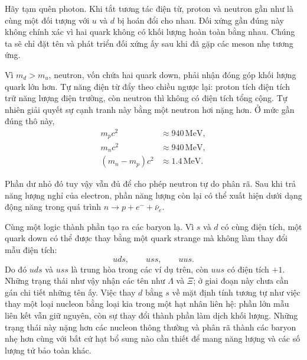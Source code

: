 Hãy tạm quên photon. Khi tắt tương tác điện từ, proton và neutron gần như là cùng một đối tượng với \(u\) và \(d\) bị hoán đổi cho nhau. Đối xứng gần đúng này không chính xác vì hai quark không có khối lượng hoàn toàn bằng nhau. Chúng ta sẽ chỉ đặt tên và phát triển đối xứng ấy sau khi đã gặp các meson nhẹ tương ứng.

Vì \(m_d>m_u\), neutron, vốn chứa hai quark down, phải nhận đóng góp khối lượng quark lớn hơn. Tự năng điện từ đẩy theo chiều ngược lại: proton tích điện tích trữ năng lượng điện trường, còn neutron thì không có điện tích tổng cộng. Tự nhiên giải quyết sự cạnh tranh này bằng một neutron hơi nặng hơn. Ở mức gần đúng thô này,
\begin{align}
m_pc^2&\approx940\,\mathrm{MeV},\\
m_nc^2&\approx940\,\mathrm{MeV},\\
(m_n-m_p)c^2&\approx1.4\,\mathrm{MeV}.
\end{align}

\begin{classroomqa}
\end{classroomqa}

Phần dư nhỏ đó tuy vậy vẫn đủ để cho phép neutron tự do phân rã. Sau khi trả năng lượng nghỉ của electron, phần năng lượng còn lại có thể xuất hiện dưới dạng động năng trong quá trình \(n\to p+e^-+\bar\nu_e\).

Cùng một logic thành phần tạo ra các baryon lạ. Vì \(s\) và \(d\) có cùng điện tích, một quark down có thể được thay bằng một quark strange mà không làm thay đổi mẫu điện tích:
\begin{equation}
uds,\qquad uss,\qquad uus.
\end{equation}
Do đó \(uds\) và \(uss\) là trung hòa trong các ví dụ trên, còn \(uus\) có điện tích \(+1\). Những trạng thái như vậy nhận các tên như \(\Lambda\) và \(\Xi\); ở giai đoạn này chưa cần gán chi tiết những tên ấy. Việc thay \(d\) bằng \(s\) về mặt định tính tương tự như việc thay một loại nucleon bằng loại kia trong một hạt nhân liên hệ: phần lớn mẫu liên kết vẫn giữ nguyên, còn sự thay đổi thành phần làm dịch khối lượng. Những trạng thái này nặng hơn các nucleon thông thường và phân rã thành các baryon nhẹ hơn cùng với bất cứ hạt bổ sung nào cần thiết để mang năng lượng và các số lượng tử bảo toàn khác.

